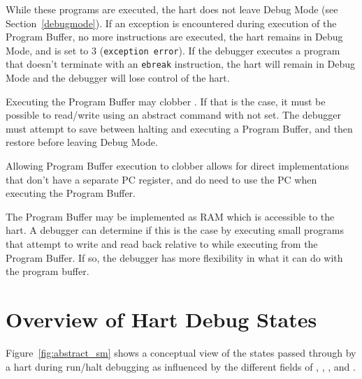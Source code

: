 While these programs are executed, the hart does not leave Debug Mode (see
Section~\ref{debugmode}).  If an exception is encountered during execution of
the Program Buffer, no more instructions are executed, the hart remains in Debug
Mode, and \FdmAbstractcsCmderr is set to 3 ({\tt exception error}).  If the debugger
executes a program that doesn't terminate with an {\tt ebreak} instruction, the
hart will remain in Debug Mode and the debugger will lose control of the hart.

Executing the Program Buffer may clobber \RcsrDpc. If that is the case, it must be
possible to read/write \RcsrDpc using an abstract command with \FacAccessregisterPostexec not set.
The debugger must attempt to save \RcsrDpc between halting and
executing a Program Buffer, and then restore \RcsrDpc before leaving Debug Mode.

\begin{commentary}
    Allowing Program Buffer execution to clobber \RcsrDpc allows for direct
    implementations that don't have a separate PC register, and do need to use
    the PC when executing the Program Buffer.
\end{commentary}

The Program Buffer may be implemented as RAM which is accessible to the
hart. A debugger can determine if this is the case by executing small
programs that attempt to write and read back relative to \Rpc while executing
from the Program Buffer.
If so, the debugger has more flexibility in what it can do with the program buffer.

\section{Overview of Hart Debug States}

Figure~\ref{fig:abstract_sm} shows a conceptual view of the states
passed through by a hart during run/halt debugging as influenced
by the different fields of \RdmDmcontrol, \RdmAbstractcs, \RdmAbstractauto, and
\RdmCommand.

